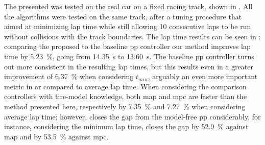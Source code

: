\documentclass[letterpaper, conference]{IEEEtran}
\begin{document}
The presented {\namealgo} was tested on the real car on a fixed racing track, shown in .
All the algorithms were tested on the same track, after a tuning procedure that aimed at minimizing lap time while still allowing 10 consecutive laps to be run without collisions with the track boundaries. 
The lap time results can be seen in : comparing the proposed {\namealgo} to the baseline \gls{pp} controller our method improves lap time by \qty{5.23}{\percent}, going from \qty{14.35}{\second} to \qty{13.60}{\second}. The baseline \gls{pp} controller turns out more consistent in the resulting lap times, but this results even in a greater improvement of \qty{6.37}{\percent} when considering $t_{min}$, arguably an even more important metric in \gls{ar} compared to average lap time.
When considering the comparison controllers with tire-model knowledge, both \gls{map} and \gls{mpc} are faster than the method presented here, respectively by \qty{7.35}{\percent} and \qty{7.27}{\percent} when considering average lap time; however, {\namealgo} closes the gap from the model-free \gls{pp} considerably, for instance, considering the minimum lap time, {\namealgo} closes the gap by \qty{52.9}{\percent} against \gls{map} and by \qty{53.5}{\percent} against \gls{mpc}.
\end{document}
